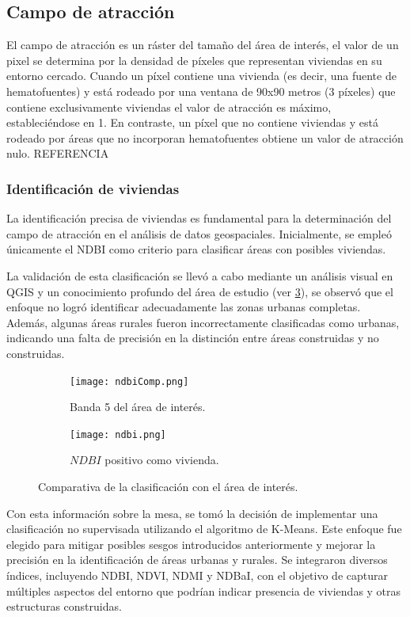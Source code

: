 \subsection{Campo de atracción} \label{campo-de-atraccion}

El campo de atracción es un ráster del tamaño del área de interés, el valor de un pixel se determina por la densidad de píxeles que representan viviendas en su entorno cercado. Cuando un píxel contiene una vivienda (es decir, una fuente de hematofuentes) y está rodeado por una ventana de 90x90 metros (3 píxeles) que contiene exclusivamente viviendas el valor de atracción es máximo, estableciéndose en 1. En contraste, un píxel que no contiene viviendas y está rodeado por áreas que no incorporan hematofuentes obtiene un valor de atracción nulo. REFERENCIA

\subsubsection{Identificación de viviendas}

La identificación precisa de viviendas es fundamental para la determinación del campo de atracción en el análisis de datos geospaciales. Inicialmente, se empleó únicamente el NDBI como criterio para clasificar áreas con posibles viviendas. 

La validación de esta clasificación se llevó a cabo mediante un análisis visual en QGIS y un conocimiento profundo del área de estudio (ver \figurename \ref{fig:comparativa-ndbi}), se observó que el enfoque no logró identificar adecuadamente las zonas urbanas completas. Además, algunas áreas rurales fueron incorrectamente clasificadas como urbanas, indicando una falta de precisión en la distinción entre áreas construidas y no construidas.

\begin{figure}[!tbp]
	\begin{subfigure}[b]{0.49\textwidth}
		\texttt{[image: ndbiComp.png]}
		\caption{Banda 5 del área de interés.}
		\label{fig:f1}
	\end{subfigure}
	\hfill
	\begin{subfigure}[b]{0.49\textwidth}
		\texttt{[image: ndbi.png]}
		\caption{$NDBI$ positivo como vivienda.}
		\label{fig:f2}
	\end{subfigure}
	\caption{Comparativa de la clasificación con el área de interés.}
	\label{fig:comparativa-ndbi}
\end{figure}

Con esta información sobre la mesa, se tomó la decisión de implementar una clasificación no supervisada utilizando el algoritmo de K-Means. Este enfoque fue elegido para mitigar posibles sesgos introducidos anteriormente y mejorar la precisión en la identificación de áreas urbanas y rurales. Se integraron diversos índices, incluyendo NDBI, NDVI, NDMI y NDBaI, con el objetivo de capturar múltiples aspectos del entorno que podrían indicar presencia de viviendas y otras estructuras construidas.

